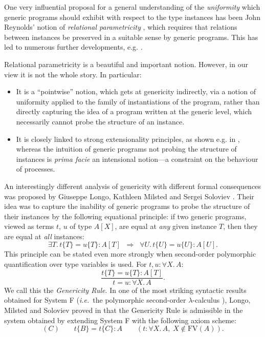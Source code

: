 \documentclass[a4paper,11pt]{article}
\newcommand{\ie}{\textit{i.e.}\ }
\begin{document}
One very influential proposal for a general understanding of the
\emph{uniformity} which generic programs should exhibit with respect
to the  type instances has been John Reynolds' notion of
\emph{relational parametricity} \cite{Rey83}, which requires that
relations between  instances be preserved in a suitable sense
by generic programs. This has led to numerous further
developments, e.g. \cite{MR92,ACC93,PA93}.

Relational parametricity is a beautiful and important notion. However,
in our view it is not the whole story. In particular:
\begin{itemize}
\item It is a ``pointwise'' notion, which gets at genericity
  indirectly, via a notion of uniformity applied to the family of
  instantiations of the program, rather than directly
  capturing the idea of a  program written at the generic level,
  which necessarily cannot probe the structure
  of an instance.
\item It is closely linked to strong extensionality principles, as
  shown e.g. in \cite{ACC93,PA93}, whereas the intuition of generic programs not
  probing the structure of instances is \textit{prima facie} an
intensional notion---a constraint on the behaviour of processes.
\end{itemize}
An interestingly different analysis of genericity with different
formal consequences was proposed by Giuseppe Longo, Kathleen Milsted
and Sergei Soloviev \cite{LMS93,Lon95}. Their idea
was to capture the inability of generic programs to probe the
structure of their instances by the following equational principle: if
two generic programs, viewed as terms $t$, $u$ of type $A[X]$, are
equal at \emph{any} given instance $T$, then they are equal at
\emph{all} instances:
\[ \exists T. \, t\{ T \} = u\{ T \}  :  A[T] \;\;
\Longrightarrow \;\; \forall U. \, t \{ U \} = u \{ U \} : A[U] . \]
This principle can be stated even more strongly when second-order
polymorphic quantification over type variables is used. For $t, u :
\forall X. \, A$:
\[  \frac{t\{ T \} = u\{ T \}  :  A[T]}
{t  = u  : \forall X. \, A}. \]
We call this the \emph{Genericity Rule}.
In one of the most striking syntactic results obtained for System F
(\ie the polymorphic second-order $\lambda$-calculus \cite{Gir72,Rey74}), Longo, Milsted
and Soloviev proved in \cite{LMS93} that the Genericity Rule is admissible in the system
obtained by extending System F with the following axiom scheme:
\[ (C) \qquad t \{ B \} = t \{ C \} : A \qquad (t : \forall X. \, A, \; X \not\in
\mathrm{FV}(A)) . \]
\end{document}
